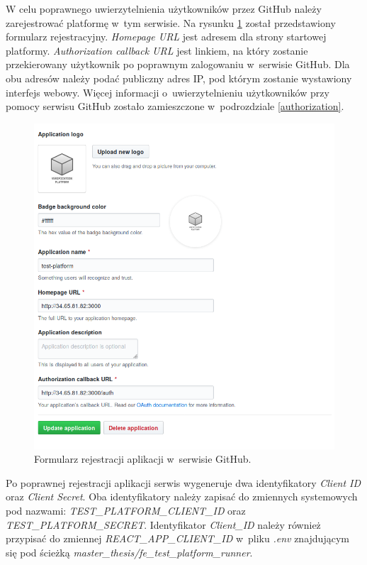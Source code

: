 W celu poprawnego uwierzytelnienia użytkowników przez GitHub należy zarejestrować platformę w~tym serwisie.
Na rysunku \ref{fig:github_app_register} został przedstawiony formularz rejestracyjny.
\textit{Homepage URL} jest adresem dla strony startowej platformy.
\textit{Authorization callback URL} jest linkiem, na który zostanie przekierowany użytkownik po poprawnym zalogowaniu w~serwisie GitHub.
Dla obu adresów należy podać publiczny adres IP, pod którym zostanie wystawiony interfejs webowy.
Więcej informacji o~uwierzytelnieniu użytkowników przy pomocy serwisu GitHub zostało zamieszczone w~podrozdziale \ref{authorization}.

\begin{figure}[h]
    \centering
    \includegraphics[width = 12cm]{chapter05/github_app_register.png}
    \caption{Formularz rejestracji aplikacji w~serwisie GitHub.}
    \label{fig:github_app_register}
\end{figure}

Po poprawnej rejestracji aplikacji serwis wygeneruje dwa identyfikatory \textit{Client ID} oraz \textit{Client Secret}.
Oba identyfikatory należy zapisać do zmiennych systemowych pod nazwami: \textit{TEST\_PLATFORM\_CLIENT\_ID} oraz \textit{TEST\_PLATFORM\_SECRET}.
Identyfikator \textit{Client\_ID} należy również przypisać do zmiennej \textit{REACT\_APP\_CLIENT\_ID} w~pliku \textit{.env} znajdującym się pod ścieżką \textit{master\_thesis/fe\_test\_platform\_runner}.

